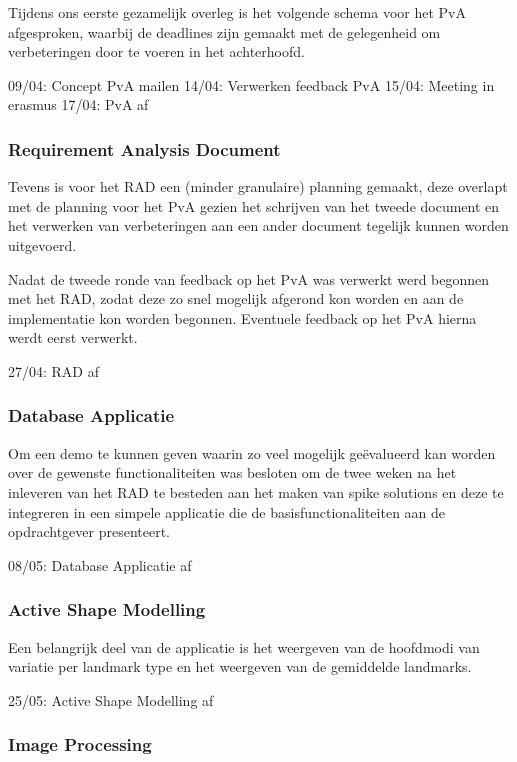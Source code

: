 Tijdens ons eerste gezamelijk overleg is het volgende schema voor het PvA
afgesproken, waarbij de deadlines zijn gemaakt met de gelegenheid om
verbeteringen door te voeren in het achterhoofd.

09/04: Concept PvA mailen
14/04: Verwerken feedback PvA
15/04: Meeting in erasmus
17/04: PvA af

\subsubsection{Requirement Analysis Document}

Tevens is voor het RAD een (minder granulaire) planning gemaakt, deze overlapt
met de planning voor het PvA gezien het schrijven van het tweede document en
het verwerken van verbeteringen aan een ander document tegelijk kunnen worden
uitgevoerd.

Nadat de tweede ronde van feedback op het PvA was verwerkt werd begonnen met
het RAD, zodat deze zo snel mogelijk afgerond kon worden en aan de
implementatie kon worden begonnen. Eventuele feedback op het PvA hierna werdt
eerst verwerkt.

27/04: RAD af

\subsubsection{Database Applicatie}

Om een demo te kunnen geven waarin zo veel mogelijk ge\"{e}valueerd kan worden
over de gewenste functionaliteiten was besloten om de twee weken na het
inleveren van het RAD te besteden aan het maken van spike solutions en deze te
integreren in een simpele applicatie die de basisfunctionaliteiten aan de
opdrachtgever presenteert.

08/05: Database Applicatie af

\subsubsection{Active Shape Modelling}

Een belangrijk deel van de applicatie is het weergeven van de hoofdmodi van
variatie per landmark type en het weergeven van de gemiddelde landmarks.

25/05: Active Shape Modelling af

\subsubsection{Image Processing}

